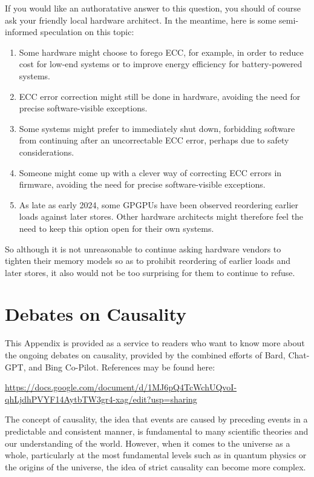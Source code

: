 \documentclass[10]{article}
\begin{document}
If you would like an authoratative answer to this question, you should of
course ask your friendly local hardware architect.
In the meantime, here is some semi-informed speculation on this topic:

\begin{enumerate}
\item	Some hardware might choose to forego ECC, for example, in order to
	reduce cost for low-end systems or to improve energy efficiency
	for battery-powered systems.
\item	ECC error correction might still be done in hardware, avoiding
	the need for precise software-visible exceptions.
\item	Some systems might prefer to immediately shut down, forbidding
	software from continuing after an uncorrectable ECC error,
	perhaps due to safety considerations.
\item	Someone might come up with a clever way of correcting ECC errors
	in firmware, avoiding the need for precise software-visible
	exceptions.
\item	As late as early 2024, some GPGPUs have been observed reordering
	earlier loads against later stores.
	Other hardware architects might therefore feel the need to keep
	this option open for their own systems.
\end{enumerate}

So although it is not unreasonable to continue asking hardware vendors
to tighten their memory models so as to prohibit reordering of earlier
loads and later stores, it also would not be too surprising for them to
continue to refuse.

\clearpage

\section{Debates on Causality}
\label{sec:Debates on Causality}

This Appendix is provided as a service to readers who want to know more
about the ongoing debates on causality, provided by the combined efforts
of Bard, Chat-GPT, and Bing Co-Pilot.
References may be found here:

{ \scriptsize
\url{https://docs.google.com/document/d/1MJ6pQ4TcWchUQvoI-qhLjdhPVYF14AytbTW3gr4-xag/edit?usp=sharing}
}

The concept of causality, the idea that events are caused by preceding
events in a predictable and consistent manner, is fundamental to many
scientific theories and our understanding of the world.
However, when it comes to the universe as a whole, particularly at the
most fundamental levels such as in quantum physics or the origins of
the universe, the idea of strict causality can become more complex.
\end{document}
